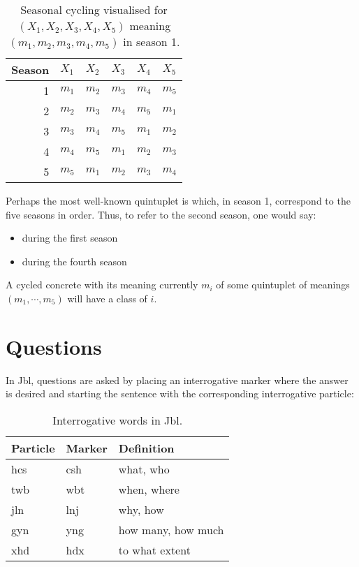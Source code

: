 \documentclass{book}
\newcommand{\lname}{Jbl}
\begin{document}
\begin{table}[h]
  \caption{Seasonal cycling visualised for $(X_1, X_2, X_3, X_4, X_5)$ meaning $(m_1, m_2, m_3, m_4, m_5)$ in season 1.}
  \centering
  \begin{tabular}{r|lllll}
    Season & $X_1$ & $X_2$ & $X_3$ & $X_4$ & $X_5$ \\
    \hline
    1 & $m_1$ & $m_2$ & $m_3$ & $m_4$ & $m_5$ \\
    2 & $m_2$ & $m_3$ & $m_4$ & $m_5$ & $m_1$ \\
    3 & $m_3$ & $m_4$ & $m_5$ & $m_1$ & $m_2$ \\
    4 & $m_4$ & $m_5$ & $m_1$ & $m_2$ & $m_3$ \\
    5 & $m_5$ & $m_1$ & $m_2$ & $m_3$ & $m_4$ \\
  \end{tabular}
\end{table}

Perhaps the most well-known quintuplet is  which, in season 1, correspond to the five seasons in order. Thus, to refer to the second season, one would say:

\begin{itemize}
  \item {} during the first season
  \item {} during the fourth season
\end{itemize}

A cycled concrete with its meaning currently $m_i$ of some quintuplet of meanings $(m_1, \cdots, m_5)$ will have a class of $i$.

\section{Questions}

In \lname{}, questions are asked by placing an interrogative marker where the answer is desired and starting the sentence with the corresponding interrogative particle:

\begin{table}[h]
  \caption{Interrogative words in \lname.}
  \centering
  \begin{tabular}{>{\kardinal}l>{\kardinal}ll}
    \textnormal{Particle} & \textnormal{Marker} & Definition \\
    \hline
    hcs & csh & what, who \\
    twb & wbt & when, where \\
    jln & lnj & why, how \\
    gyn & yng & how many, how much \\
    xhd & hdx & to what extent \\
  \end{tabular}
\end{table}
\end{document}
